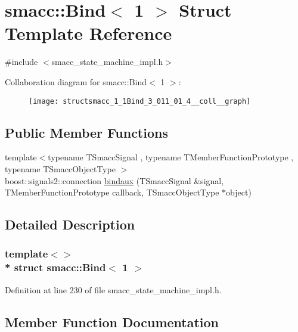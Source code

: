\hypertarget{structsmacc_1_1Bind_3_011_01_4}{}\section{smacc\+:\+:Bind$<$ 1 $>$ Struct Template Reference}
\label{structsmacc_1_1Bind_3_011_01_4}


{\ttfamily \#include $<$smacc\+\_\+state\+\_\+machine\+\_\+impl.\+h$>$}



Collaboration diagram for smacc\+:\+:Bind$<$ 1 $>$\+:
\nopagebreak
\begin{figure}[H]
\begin{center}
\leavevmode
\texttt{[image: structsmacc\_1\_1Bind\_3\_011\_01\_4\_\_coll\_\_graph]}
\end{center}
\end{figure}
\subsection*{Public Member Functions}
\begin{DoxyCompactItemize}
\item 
{\footnotesize template$<$typename T\+Smacc\+Signal , typename T\+Member\+Function\+Prototype , typename T\+Smacc\+Object\+Type $>$ }\\boost\+::signals2\+::connection \hyperlink{structsmacc_1_1Bind_3_011_01_4_ab1ef45ad9d56f707284a5fcb166646ee}{bindaux} (T\+Smacc\+Signal \&signal, T\+Member\+Function\+Prototype callback, T\+Smacc\+Object\+Type $\ast$object)
\end{DoxyCompactItemize}


\subsection{Detailed Description}
\subsubsection*{template$<$$>$\\*
struct smacc\+::\+Bind$<$ 1 $>$}



Definition at line 230 of file smacc\+\_\+state\+\_\+machine\+\_\+impl.\+h.



\subsection{Member Function Documentation}
